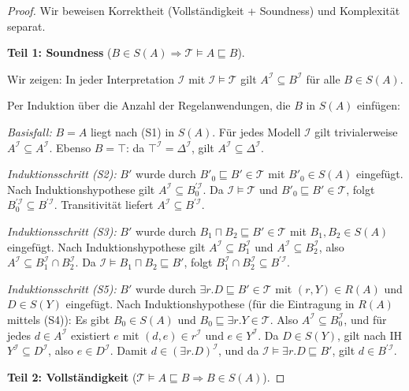 ﻿\documentclass[a4paper,12pt]{article}
\theoremstyle{definition}
\theoremstyle{plain}
\theoremstyle{remark}
\newcommand{\Tbox}{\ensuremath{\mathcal{T}}}
\newcommand{\interp}[1]{\ensuremath{\mathcal{#1}}}
\newcommand{\Dom}[1]{\ensuremath{\Delta^{\interp{#1}}}}
\begin{document}
\begin{proof}
Wir beweisen Korrektheit (Vollst{\"{a}}ndigkeit + Soundness) und
Komplexit{\"{a}}t separat.

\textbf{Teil 1: Soundness} ($B \in S(A) \Rightarrow \Tbox \models A \sqsubseteq B$).

Wir zeigen: In jeder Interpretation $\interp{I}$ mit
$\interp{I} \models \Tbox$ gilt $A^\interp{I} \subseteq B^\interp{I}$
f{\"{u}}r alle $B \in S(A)$.

Per Induktion {\"{u}}ber die Anzahl der Regelanwendungen, die $B$ in $S(A)$
einf{\"{u}}gen:

\textit{Basisfall:} $B = A$ liegt nach (S1) in $S(A)$.
F{\"{u}}r jedes Modell $\interp{I}$ gilt trivialerweise
$A^\interp{I} \subseteq A^\interp{I}$.
Ebenso $B = \top$: da $\top^\interp{I} = \Dom{I}$,
gilt $A^\interp{I} \subseteq \Dom{I}$.

\textit{Induktionsschritt (S2):}
$B'$ wurde durch $B'_0 \sqsubseteq B' \in \Tbox$ mit $B'_0 \in S(A)$
eingef{\"{u}}gt. Nach Induktionshypothese gilt
$A^\interp{I} \subseteq B_0^{\prime\interp{I}}$.
Da $\interp{I} \models \Tbox$ und $B'_0 \sqsubseteq B' \in \Tbox$,
folgt $B_0^{\prime\interp{I}} \subseteq B^{\prime\interp{I}}$.
Transitivit{\"{a}}t liefert $A^\interp{I} \subseteq B^{\prime\interp{I}}$.

\textit{Induktionsschritt (S3):}
$B'$ wurde durch $B_1 \sqcap B_2 \sqsubseteq B' \in \Tbox$
mit $B_1, B_2 \in S(A)$ eingef{\"{u}}gt.
Nach Induktionshypothese gilt
$A^\interp{I} \subseteq B_1^\interp{I}$ und
$A^\interp{I} \subseteq B_2^\interp{I}$, also
$A^\interp{I} \subseteq B_1^\interp{I} \cap B_2^\interp{I}$.
Da $\interp{I} \models B_1 \sqcap B_2 \sqsubseteq B'$,
folgt $B_1^\interp{I} \cap B_2^\interp{I} \subseteq B^{\prime\interp{I}}$.

\textit{Induktionsschritt (S5):}
$B'$ wurde durch $\exists r.D \sqsubseteq B' \in \Tbox$
mit $(r,Y) \in R(A)$ und $D \in S(Y)$ eingef{\"{u}}gt.
Nach Induktionshypothese (f{\"{u}}r die Eintragung in $R(A)$ mittels (S4)):
Es gibt $B_0 \in S(A)$ und $B_0 \sqsubseteq \exists r.Y \in \Tbox$.
Also $A^\interp{I} \subseteq B_0^\interp{I}$,
und f{\"{u}}r jedes $d \in A^\interp{I}$ existiert
$e$ mit $(d,e) \in r^\interp{I}$ und $e \in Y^\interp{I}$.
Da $D \in S(Y)$, gilt nach IH $Y^\interp{I} \subseteq D^\interp{I}$,
also $e \in D^\interp{I}$.
Damit $d \in (\exists r.D)^\interp{I}$, und da
$\interp{I} \models \exists r.D \sqsubseteq B'$,
gilt $d \in B^{\prime\interp{I}}$.

\textbf{Teil 2: Vollst{\"{a}}ndigkeit}
($\Tbox \models A \sqsubseteq B \Rightarrow B \in S(A)$).


\end{proof}
\end{document}

